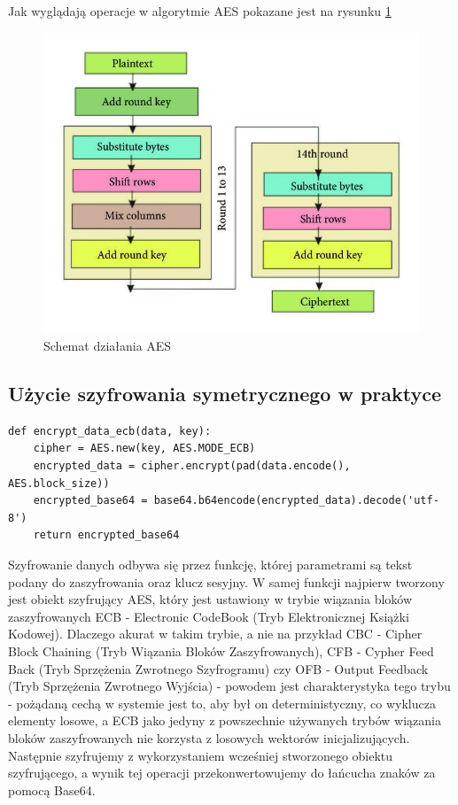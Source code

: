 \vspace{0.3\baselineskip}

Jak wyglądają operacje w algorytmie AES pokazane jest na rysunku \ref{fig:AES2}
\begin{figure}[H]
    \centering
    \includegraphics[width=\textwidth]{Images/AES2.jpg}
    \caption{Schemat działania AES}
    \label{fig:AES2}
\end{figure}

\subsection{Użycie szyfrowania symetrycznego w praktyce}

\begin{lstlisting}
def encrypt_data_ecb(data, key):
    cipher = AES.new(key, AES.MODE_ECB)
    encrypted_data = cipher.encrypt(pad(data.encode(), AES.block_size))
    encrypted_base64 = base64.b64encode(encrypted_data).decode('utf-8')
    return encrypted_base64
\end{lstlisting}
Szyfrowanie danych odbywa się przez funkcję, której parametrami są tekst podany do zaszyfrowania oraz klucz sesyjny. W samej funkcji najpierw tworzony jest obiekt szyfrujący AES, który jest ustawiony w trybie wiązania bloków zaszyfrowanych ECB - Electronic CodeBook (Tryb Elektronicznej Książki Kodowej). Dlaczego akurat w takim trybie, a nie na przykład CBC - Cipher Block Chaining (Tryb Wiązania Bloków Zaszyfrowanych), CFB - Cypher Feed Back (Tryb Sprzężenia Zwrotnego Szyfrogramu) czy OFB - Output Feedback (Tryb Sprzężenia Zwrotnego Wyjścia) - powodem jest charakterystyka tego trybu - pożądaną cechą w systemie jest to, aby był on deterministyczny, co wyklucza elementy losowe, a ECB jako jedyny z powszechnie używanych trybów wiązania bloków zaszyfrowanych nie korzysta z losowych wektorów inicjalizujących. Następnie szyfrujemy z wykorzystaniem wcześniej stworzonego obiektu szyfrującego, a wynik tej operacji przekonwertowujemy do łańcucha znaków za pomocą Base64.

